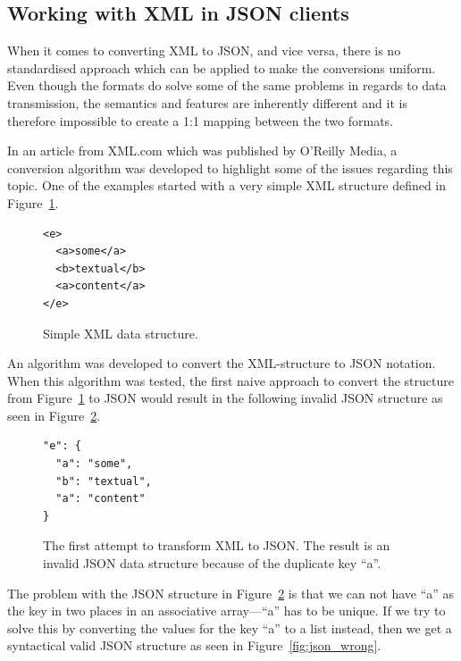 \documentclass{cslthse-msc}
\begin{document}
\subsection{Working with XML in JSON clients}
\label{xml_json}

When it comes to converting XML to JSON, and vice versa, there is no standardised approach which can be applied to make the conversions uniform. Even though the formats do solve some of the same problems in regards to data transmission, the semantics and features are inherently different and it is therefore impossible to create a 1:1 mapping between the two formats.

In an article from XML.com\cite{xml_json} which was published by O'Reilly Media, a conversion algorithm was developed to highlight some of the issues regarding this topic. One of the examples started with a very simple XML structure defined in Figure~\ref{fig:xml_structure}.

\begin{figure}[H]
  \centering
    \begin{center}
\begin{lstlisting}[breaklines=true,frame=single]
<e>
  <a>some</a>
  <b>textual</b>
  <a>content</a>
</e>
\end{lstlisting}
    \end{center}
  \caption{Simple XML data structure.}
  \label{fig:xml_structure}
\end{figure}

An algorithm was developed to convert the XML-structure to JSON notation. When this algorithm was tested, the first naive approach to convert the structure from Figure~\ref{fig:xml_structure} to JSON would result in the following invalid JSON structure as seen in Figure~\ref{fig:xml_wrong}.

\begin{figure}[H]
  \centering
    \begin{center}
\begin{lstlisting}[breaklines=true,frame=single]
"e": {
  "a": "some",
  "b": "textual",
  "a": "content"
}
\end{lstlisting}
    \end{center}
  \caption{The first attempt to transform XML to JSON. The result is an invalid JSON data structure because of the duplicate key \enquote{a}.}
  \label{fig:xml_wrong}
\end{figure}

The problem with the JSON structure in Figure~\ref{fig:xml_wrong} is that we can not have \enquote{a} as the key in two places in an associative array---\enquote{a} has to be unique. If we try to solve this by converting the values for the key \enquote{a} to a list instead, then we get a syntactical valid JSON structure as seen in Figure~\ref{fig:json_wrong}.
\end{document}
